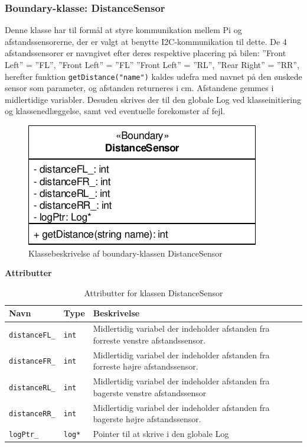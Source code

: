\subsubsection{Boundary-klasse: DistanceSensor}

Denne klasse har til formål at styre kommunikation mellem Pi og afstandssensorerne, der er valgt at benytte I2C-kommunikation til dette. De 4 afstandssensorer er navngivet efter deres respektive placering på bilen: ''Front Left'' = ''FL'', ''Front Left'' = ''FL'' ''Front Left'' = ''RL'', ''Rear Right'' = ''RR'', herefter funktion  \texttt{getDistance("name")} kaldes udefra med navnet på den ønskede sensor som parameter, og afstanden returneres i cm. Afstandene gemmes i midlertidige variabler. Desuden skrives der til den globale Log ved klasseinitiering og klassenedlæggelse, samt ved eventuelle forekomster af fejl.

\begin{figure}[h]
\centering
\includegraphics[]{../fig/diagrammer/bil/cd_distancesensor.pdf}
\caption{Klassebeskrivelse af boundary-klassen DistanceSensor}
\label{fig:cd_distancesensor}
\end{figure}

\textbf{Attributter}

\begin{table}[h]
	\begin{tabularx}{\textwidth}{| Z | Z | L{10cm} |} \hline
		Navn & Type & Beskrivelse \\\hline
		\texttt{distanceFL\_} & \texttt{int} 		& Midlertidig variabel der indeholder afstanden fra forreste venstre afstandssensor.\\\hline
		\texttt{distanceFR\_} & \texttt{int} 		& Midlertidig variabel der indeholder afstanden fra forreste højre afstandssensor.	\\\hline
		\texttt{distanceRL\_} & \texttt{int} 		& Midlertidig variabel der indeholder afstanden fra bagerste venstre afstandssensor \\\hline
		\texttt{distanceRR\_} & \texttt{int} 		& Midlertidig variabel der indeholder afstanden fra bagerste højre afstandssensor.	\\\hline
		\texttt{logPtr\_} 	 & \texttt{log*} 		& Pointer til at skrive i den globale Log											\\\hline
	\end{tabularx}
	\caption{Attributter for klassen DistanceSensor}
	\label{table:attr_distancesensor}
\end{table}
\clearpage

